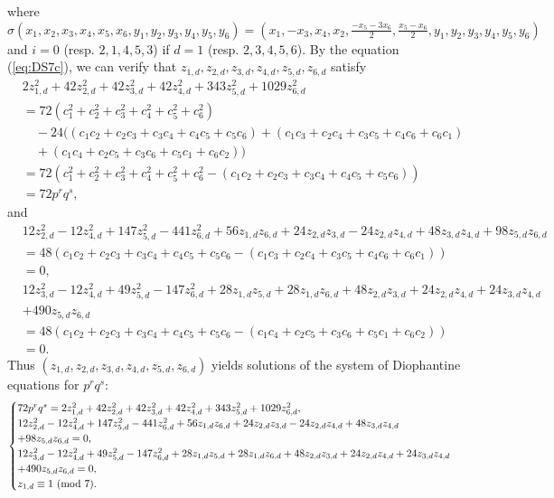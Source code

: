 \documentclass[a4paper, 11pt]{amsart}
\theoremstyle{plain}
\theoremstyle{definition}
\numberwithin{equation}{section}
\begin{document}
where $\sigma(x_1,x_2,x_3,x_4,x_5,x_6,y_1,y_2,y_3,y_4,y_5,y_6)=(x_1,-x_3,x_4,x_2,\frac{-x_5-3x_6}{2},\frac{x_5-x_6}{2},y_1,y_2,y_3,y_4,y_5,y_6)$ and $i=0$ 
(resp. $2,1,4,5,3$)
if $d=1$ (resp. $2,3,4,5,6$). 
By the equation (\ref{eq:DS7c}), 
we can verify that 
$z_{1,d},z_{2,d},z_{3,d}, z_{4,d},z_{5,d},z_{6,d}$ satisfy
\begin{align*}
&2z_{1,d}^2+42z_{2,d}^2+42z_{3,d}^2+42z_{4,d}^2+343z_{5,d}^2+1029z_{6,d}^2\\
&=72(c_1^2+ c_2^2 + c_3^2  + c_4^2 + c_5^2 + c_6^2)\\
&\quad  - 24(
(c_1c_2 + c_2c_3 + c_3c_4 + c_4c_5 + c_5c_6)+
(c_1c_3 + c_2c_4 + c_3c_5 + c_4c_6 + c_6c_1)\\
&\quad
+(c_1c_4 + c_2c_5 + c_3c_6 + c_5c_1 + c_6c_2))\\
&=72(c_1^2+ c_2^2 + c_3^2  + c_4^2 + c_5^2 + c_6^2- (c_1c_2 + c_2c_3 + c_3c_4 + c_4c_5 + c_5c_6))\\
&=72p^rq^s,
\end{align*}
and
\begin{align*}
&12z_{2,d}^2-12z_{4,d}^2+147z_{5,d}^2-441z_{6,d}^2+56z_{1,d}z_{6,d}+24z_{2,d}z_{3,d}-24z_{2,d}z_{4,d}+48z_{3,d}z_{4,d}+98z_{5,d}z_{6,d}\\
&=48(c_1c_2 + c_2c_3 + c_3c_4 + c_4c_5  + c_5c_6 - (c_1c_3 + c_2c_4 + c_3c_5 + c_4c_6  + c_6c_1))\\
&=0,\\
&12z_{3,d}^2-12z_{4,d}^2+49z_{5,d}^2-147z_{6,d}^2+28z_{1,d}z_{5,d}+28z_{1,d}z_{6,d}+48z_{2,d}z_{3,d}+24z_{2,d}z_{4,d}+24z_{3,d}z_{4,d}\\
&+490z_{5,d}z_{6,d}\\
&=48(c_1c_2 + c_2c_3 + c_3c_4 + c_4c_5 + c_5c_6 - (c_1c_4 + c_2c_5 + c_3c_6 + c_5c_1 + c_6c_2))\\
&=0.
\end{align*}
Thus $(z_{1,d},z_{2,d},z_{3,d},z_{4,d},z_{5,d},z_{6,d})$ yields solutions of the system of Diophantine equations 
for $p^rq^s$:
\begin{align*}
\begin{cases}
72p^rq^s=2z_{1,d}^2+42z_{2,d}^2+42z_{3,d}^2+42z_{4,d}^2+343z_{5,d}^2+1029z_{6,d}^2, \\
12z_{2,d}^2-12z_{4,d}^2+147z_{5,d}^2-441z_{6,d}^2+56z_{1,d}z_{6,d}+24z_{2,d}z_{3,d}
-24z_{2,d}z_{4,d}+48z_{3,d}z_{4,d}\\
+98z_{5,d}z_{6,d}=0, \\
12z_{3,d}^2-12z_{4,d}^2+49z_{5,d}^2-147z_{6,d}^2+28z_{1,d}z_{5,d}+28z_{1,d}z_{6,d}+48z_{2,d}z_{3,d}+24z_{2,d}z_{4,d}+24z_{3,d}z_{4,d}\\
+490z_{5,d}z_{6,d}=0,\\
z_{1,d}\equiv 1\ ({\rm mod}\ 7).
\end{cases}
\end{align*}
\end{document}
